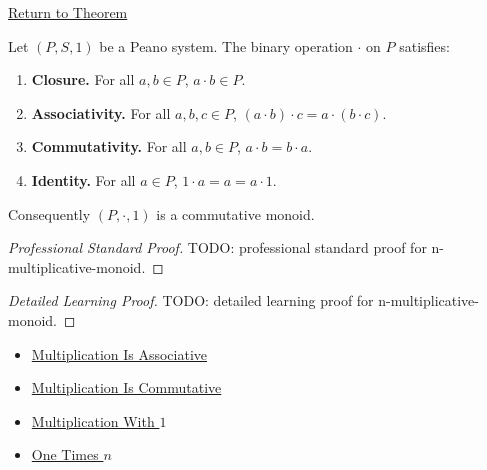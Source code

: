 \newpage
{}
\label{prf:n-multiplicative-monoid}

\begin{remark*}[Return]
\hyperref[thm:n-multiplicative-monoid]{Return to Theorem}
\end{remark*}

\begin{theorem*}
Let $(P,S,1)$ be a Peano system. The binary operation $\cdot$ on $P$ satisfies:
\begin{enumerate}
  \item \textbf{Closure.} For all $a,b \in P$, $a \cdot b \in P$.
  \item \textbf{Associativity.} For all $a,b,c \in P$,
  $(a \cdot b) \cdot c = a \cdot (b \cdot c)$.
  \item \textbf{Commutativity.} For all $a,b \in P$,
  $a \cdot b = b \cdot a$.
  \item \textbf{Identity.} For all $a \in P$,
  $1 \cdot a = a = a \cdot 1$.
\end{enumerate}
Consequently $(P, \cdot, 1)$ is a commutative monoid.
\end{theorem*}

\begin{proof}[Professional Standard Proof]
\LRAProofBodyStart
TODO: professional standard proof for n-multiplicative-monoid.
\end{proof}

\begin{proof}[Detailed Learning Proof]
\LRAProofBodyStart
TODO: detailed learning proof for n-multiplicative-monoid.
\end{proof}

\begin{remark*}
\end{remark*}

\begin{dependencies}
\begin{itemize}
  \item \hyperref[thm:multiplication-associative]{Multiplication Is Associative}
  \item \hyperref[thm:multiplication-commutative]{Multiplication Is Commutative}
  \item \hyperref[thm:multiplication-with-one]{Multiplication With $1$}
  \item \hyperref[thm:one-times-n]{One Times $n$}
\end{itemize}
\end{dependencies}

\clearpage
